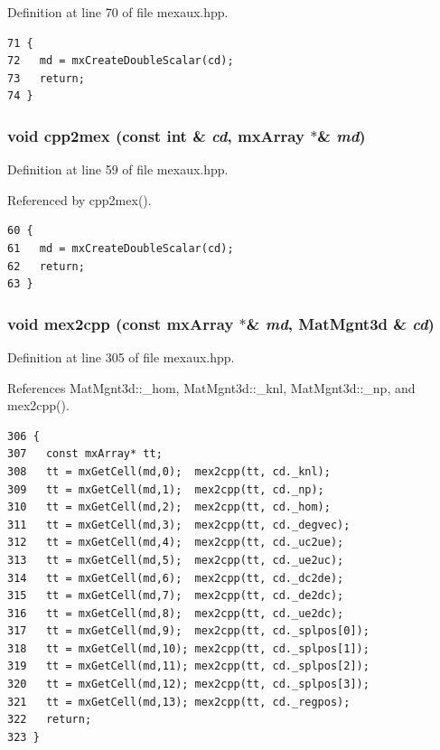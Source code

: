 Definition at line 70 of file mexaux.hpp.

\footnotesize\begin{verbatim}71 {
72   md = mxCreateDoubleScalar(cd);
73   return;
74 }
\end{verbatim}\normalsize 


\subsubsection{\setlength{\rightskip}{0pt plus 5cm}void cpp2mex (const int \& {\em cd}, mx\-Array $\ast$\& {\em md})\hspace{0.3cm}{\tt  [inline]}}\label{mexaux_8hpp_570dfd362ef7c82486e20224107d5639_570dfd362ef7c82486e20224107d5639}




Definition at line 59 of file mexaux.hpp.

Referenced by cpp2mex().

\footnotesize\begin{verbatim}60 {
61   md = mxCreateDoubleScalar(cd);
62   return;
63 }
\end{verbatim}\normalsize 


\subsubsection{\setlength{\rightskip}{0pt plus 5cm}void mex2cpp (const mx\-Array $\ast$\& {\em md}, {\bf Mat\-Mgnt3d} \& {\em cd})\hspace{0.3cm}{\tt  [inline]}}\label{mexaux_8hpp_b1133945d60246d2e82a7e2dfc962fe9_b1133945d60246d2e82a7e2dfc962fe9}




Definition at line 305 of file mexaux.hpp.

References Mat\-Mgnt3d::\_\-hom, Mat\-Mgnt3d::\_\-knl, Mat\-Mgnt3d::\_\-np, and mex2cpp().

\footnotesize\begin{verbatim}306 {
307   const mxArray* tt;
308   tt = mxGetCell(md,0);  mex2cpp(tt, cd._knl);
309   tt = mxGetCell(md,1);  mex2cpp(tt, cd._np);
310   tt = mxGetCell(md,2);  mex2cpp(tt, cd._hom);
311   tt = mxGetCell(md,3);  mex2cpp(tt, cd._degvec);
312   tt = mxGetCell(md,4);  mex2cpp(tt, cd._uc2ue);
313   tt = mxGetCell(md,5);  mex2cpp(tt, cd._ue2uc);
314   tt = mxGetCell(md,6);  mex2cpp(tt, cd._dc2de);
315   tt = mxGetCell(md,7);  mex2cpp(tt, cd._de2dc);
316   tt = mxGetCell(md,8);  mex2cpp(tt, cd._ue2dc);
317   tt = mxGetCell(md,9);  mex2cpp(tt, cd._splpos[0]);
318   tt = mxGetCell(md,10); mex2cpp(tt, cd._splpos[1]);
319   tt = mxGetCell(md,11); mex2cpp(tt, cd._splpos[2]);
320   tt = mxGetCell(md,12); mex2cpp(tt, cd._splpos[3]);
321   tt = mxGetCell(md,13); mex2cpp(tt, cd._regpos);
322   return;
323 }
\end{verbatim}\normalsize 


